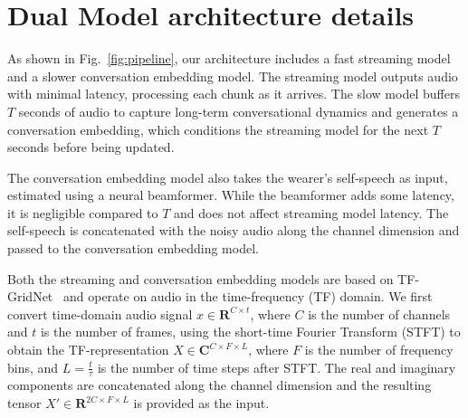 \section{Dual Model architecture details}\label{sec:dualmodeldetails}

As shown in Fig.~\ref{fig:pipeline}, our architecture includes a fast streaming model and a slower conversation embedding model. The streaming model outputs audio with minimal latency, processing each chunk as it arrives. The slow model buffers $T$ seconds of audio to capture long-term conversational dynamics and generates a conversation embedding, which conditions the streaming model for the next $T$ seconds before being updated.

The conversation embedding model also takes the wearer's self-speech as input, estimated using a neural beamformer. While the beamformer adds some latency, it is negligible compared to $T$ and does not affect streaming model latency. The self-speech is concatenated with the noisy audio along the channel dimension and passed to the conversation embedding model.


Both the streaming and conversation embedding models are based on TF-GridNet~\cite{tfgridnet} and operate on audio in the time-frequency (TF) domain. We first convert time-domain audio signal $x \in \mathbf{R}^{C \times t}$, where $C$ is the number of channels and $t$ is the number of frames, using the short-time Fourier Transform (STFT) to obtain the TF-representation $X \in \mathbf{C}^{C \times F \times L}$, where $F$ is the number of frequency bins, and $L = \frac{t}{\tau}$ is the number of time steps after STFT. The real and imaginary components are concatenated along the channel dimension and the resulting tensor $X' \in \mathbf{R}^{2C \times F \times L}$ is provided as the input. 

